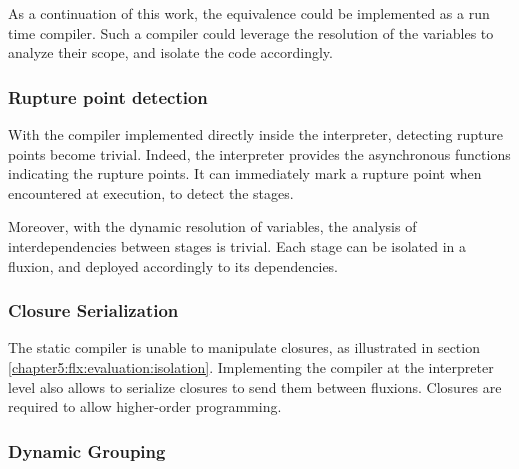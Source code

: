 As a continuation of this work, the equivalence could be implemented as a run time compiler.
Such a compiler could leverage the resolution of the variables to analyze their scope, and isolate the code accordingly.

\subsubsection{Rupture point detection}

With the compiler implemented directly inside the interpreter, detecting rupture points become trivial.
Indeed, the interpreter provides the asynchronous functions indicating the rupture points.
It can immediately mark a rupture point when encountered at execution, to detect the stages.

Moreover, with the dynamic resolution of variables, the analysis of interdependencies between stages is trivial.
Each stage can be isolated in a fluxion, and deployed accordingly to its dependencies.


\subsubsection{Closure Serialization}

The static compiler is unable to manipulate closures, as illustrated in section \ref{chapter5:flx:evaluation:isolation}.
Implementing the compiler at the interpreter level also allows to serialize closures to send them between fluxions.
Closures are required to allow higher-order programming.

\subsubsection{Dynamic Grouping}

